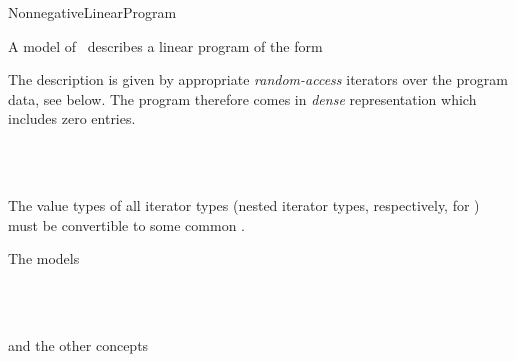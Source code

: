 \begin{ccRefConcept}{NonnegativeLinearProgram}

\ccDefinition
A model of \ccRefName\ describes a linear program of the form


The description is given by appropriate \emph{random-access} 
iterators over the program data, see below. The program therefore 
comes in \emph{dense} representation which includes zero entries.

\ccHasModels
{}\\
\\


\ccTypes





\ccOperations






\ccRequirements

The value types of all iterator types (nested iterator types,
respectively, for ) must be convertible to some common
 .

\ccSeeAlso
The models

\\
\\

and the other concepts

\\
\\
\end{ccRefConcept}

